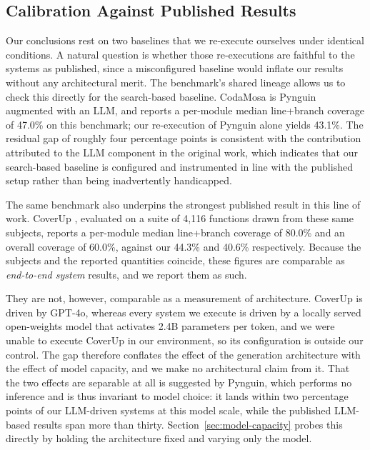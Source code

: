 \subsection{Calibration Against Published Results}
\label{sec:calibration}

Our conclusions rest on two baselines that we re-execute ourselves under identical
conditions. A natural question is whether those re-executions are faithful to the
systems as published, since a misconfigured baseline would inflate our results
without any architectural merit. The benchmark's shared lineage allows us to check
this directly for the search-based baseline. CodaMosa \cite{lemieux2023codamosa} is
Pynguin augmented with an LLM, and reports a per-module median line+branch coverage
of 47.0\% on this benchmark; our re-execution of Pynguin alone yields 43.1\%. The
residual gap of roughly four percentage points is consistent with the contribution
attributed to the LLM component in the original work, which indicates that our
search-based baseline is configured and instrumented in line with the published
setup rather than being inadvertently handicapped.

The same benchmark also underpins the strongest published result in this line of
work. CoverUp \cite{altmayer2025coverup}, evaluated on a suite of 4{,}116 functions
drawn from these same subjects, reports a per-module median line+branch coverage of
80.0\% and an overall coverage of 60.0\%, against our 44.3\% and 40.6\% respectively.
Because the subjects and the reported quantities coincide, these figures are
comparable as \emph{end-to-end system} results, and we report them as such.

They are not, however, comparable as a measurement of architecture. CoverUp is driven
by GPT-4o, whereas every system we execute is driven by a locally served
open-weights model that activates 2.4B parameters per token, and we were unable to
execute CoverUp in our environment, so its configuration is outside our control. The
gap therefore conflates the effect of the generation architecture with the effect of
model capacity, and we make no architectural claim from it. That the two effects are
separable at all is suggested by Pynguin, which performs no inference and is thus
invariant to model choice: it lands within two percentage points of our LLM-driven
systems at this model scale, while the published LLM-based results span more than
thirty. Section~\ref{sec:model-capacity} probes this directly by holding the
architecture fixed and varying only the model.

